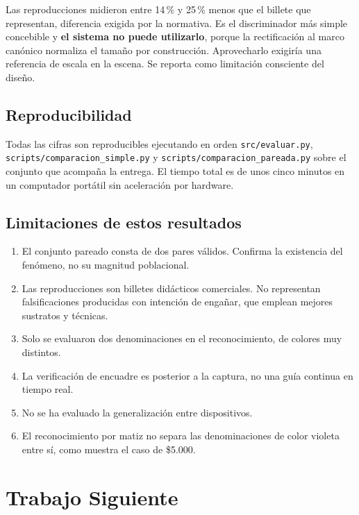 \documentclass[conference]{IEEEtran}
\begin{document}
Las reproducciones midieron entre 14\,\% y 25\,\% menos que el billete
que representan, diferencia exigida por la normativa. Es el
discriminador más simple concebible y \textbf{el sistema no puede
utilizarlo}, porque la rectificación al marco canónico normaliza el
tamaño por construcción. Aprovecharlo exigiría una referencia de escala
en la escena. Se reporta como limitación consciente del diseño.

\subsection{Reproducibilidad}

Todas las cifras son reproducibles ejecutando en orden
\texttt{src/evaluar.py}, \texttt{scripts/comparacion\_simple.py} y
\texttt{scripts/comparacion\_pareada.py} sobre el conjunto que acompaña
la entrega. El tiempo total es de unos cinco minutos en un computador
portátil sin aceleración por hardware.

\subsection{Limitaciones de estos resultados}

\begin{enumerate}
\item El conjunto pareado consta de dos pares válidos. Confirma la
      existencia del fenómeno, no su magnitud poblacional.
\item Las reproducciones son billetes didácticos comerciales. No
      representan falsificaciones producidas con intención de engañar,
      que emplean mejores sustratos y técnicas.
\item Solo se evaluaron dos denominaciones en el reconocimiento, de
      colores muy distintos.
\item La verificación de encuadre es posterior a la captura, no una
      guía continua en tiempo real.
\item No se ha evaluado la generalización entre dispositivos.
\item El reconocimiento por matiz no separa las denominaciones de
      color violeta entre sí, como muestra el caso de \$5.000.
\end{enumerate}

\section{Trabajo Siguiente}
\end{document}
